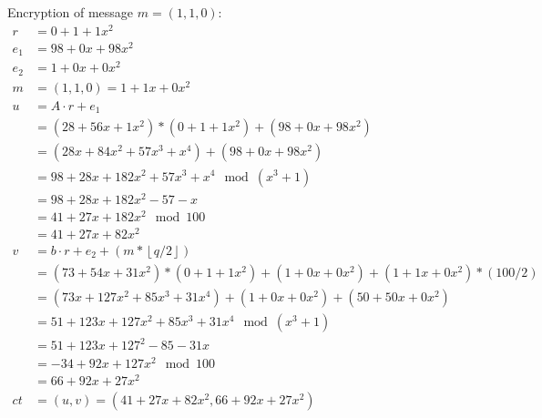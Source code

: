 Encryption of message $m=(1,1,0)$:
\begin{align*}
  r       & =0 + 1 + 1x^2                                                                    \\
  e_1     & =98 + 0x + 98x^2                                                                 \\
  e_2     & =1 + 0x + 0x^2                                                                   \\
  m       & = (1, 1, 0) = 1+ 1x+ 0x^2                                                        \\
  u       & = A \cdot r + e_1                                                                \\
          & = (28 + 56x + 1x^2)*(0 + 1 + 1x^2) + (98 + 0x + 98x^2)                           \\
          & = (28x+84x^2+57x^3+x^4) + (98 + 0x + 98x^2)                                      \\
          & = 98+28x+182x^2+57x^3+x^4 \mod (x^3+1)                                           \\
          & = 98+28x+182x^2-57-x                                                             \\
          & = 41+27x+182x^2  \mod 100                                                        \\
          & = 41+27x+82x^2                                                                   \\
  v       & = b \cdot r + e_2 + (m*\left\lfloor q/2\right\rfloor)                            \\
          & = (73 + 54x + 31x^2) * (0 + 1 + 1x^2) + (1 + 0x + 0x^2) +  (1+ 1x+ 0x^2)*(100/2) \\
          & = (73x + 127x^2 + 85x^3 + 31x^4) + (1 + 0x + 0x^2) +  (50+ 50x+ 0x^2)            \\
          & = 51 + 123x + 127x^2 + 85x^3 + 31x^4 \mod (x^3+1)                                \\
          & = 51 + 123x + 127^2 - 85 - 31x                                                   \\
          & = -34 + 92x + 127x^2 \mod 100                                                    \\
          & = 66 + 92x + 27x^2                                                               \\
  ct & = (u,v) = (41+27x+82x^2, 66 + 92x + 27x^2)                                       \\
\end{align*}

